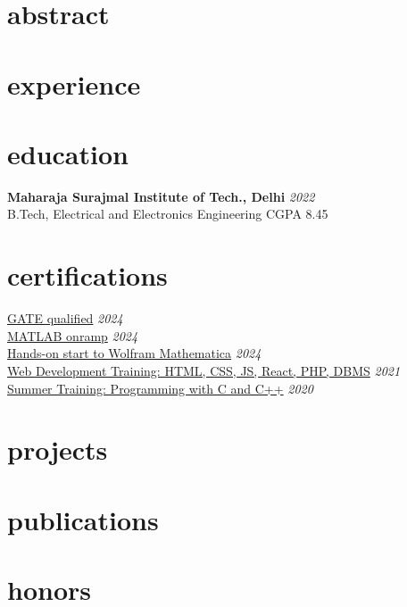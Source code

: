 \documentclass[12pt]{article}
\newcommand{\entry}[4]{{{\textbf{#1}}} \hfill \textit{#3} \\ {\footnotesize #2 \hfill #4} \\}
\newcommand{\display}[3]{\footnotesize \href {#2}{#1} \hfill \textit{#3} \\}
\begin{document}
\begin{paracol}{2}
\switchcolumn


\section{abstract}

\section{experience}


\section{education}

\entry{Maharaja Surajmal Institute of Tech., Delhi}{B.Tech, Electrical and Electronics Engineering}{2022}{CGPA 8.45}



\section{certifications}
\display{GATE qualified}{https://drive.google.com/file/d/1shcvrExVXRHoQDvvzEtomb_LwSz4b1zZ/view?usp=sharing}{2024}
\display{MATLAB onramp}{https://drive.google.com/file/d/1mkDalK8A1keLxXXYWNhQnshTT9sq1vor/view?usp=sharing}{2024}
\display{Hands-on start to Wolfram Mathematica}{https://drive.google.com/file/d/1UMcH0YTn9qbdHo8LIr4tHWEiZi-Xrejt/view?usp=sharing}{2024}
\display{Web Development Training: HTML, CSS, JS, React, PHP, DBMS}{https://drive.google.com/file/d/1BNM1FAxmFkPRrkxTPHEAF5gk_rhXNg5g/view?usp=sharing}{2021}
\display{Summer Training: Programming with C and C++}{https://drive.google.com/file/d/190HRy9cnmwrG0kCt_TeKr5rngykm1PkW/view?usp=sharing}{2020}

\section{projects}

\section{publications}  

\section{honors}




\end{paracol}
\end{document}
